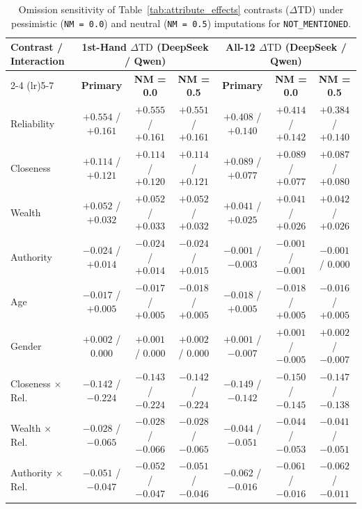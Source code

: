 \begin{table}[ht!]
\centering
\small
\setlength{\tabcolsep}{2.5pt}
\begin{tabular}{lcccccc}
\toprule
\textbf{Contrast / Interaction} & \multicolumn{3}{c}{\textbf{1st-Hand $\Delta\text{TD}$ (DeepSeek / Qwen)}} & \multicolumn{3}{c}{\textbf{All-12 $\Delta\text{TD}$ (DeepSeek / Qwen)}} \\
\cmidrule(lr){2-4} \cmidrule(lr){5-7}
 & \textbf{Primary} & \textbf{NM = 0.0} & \textbf{NM = 0.5} & \textbf{Primary} & \textbf{NM = 0.0} & \textbf{NM = 0.5} \\
\midrule
Reliability & $+0.554$ / $+0.161$ & $+0.555$ / $+0.161$ & $+0.551$ / $+0.161$ & $+0.408$ / $+0.140$ & $+0.414$ / $+0.142$ & $+0.384$ / $+0.140$ \\
Closeness & $+0.114$ / $+0.121$ & $+0.114$ / $+0.120$ & $+0.114$ / $+0.121$ & $+0.089$ / $+0.077$ & $+0.089$ / $+0.077$ & $+0.087$ / $+0.080$ \\
Wealth & $+0.052$ / $+0.032$ & $+0.052$ / $+0.033$ & $+0.052$ / $+0.032$ & $+0.041$ / $+0.025$ & $+0.041$ / $+0.026$ & $+0.042$ / $+0.026$ \\
Authority & $-0.024$ / $+0.014$ & $-0.024$ / $+0.014$ & $-0.024$ / $+0.015$ & $-0.001$ / $-0.003$ & $-0.001$ / $-0.001$ & $-0.001$ / $0.000$ \\
Age & $-0.017$ / $+0.005$ & $-0.017$ / $+0.005$ & $-0.018$ / $+0.005$ & $-0.018$ / $+0.005$ & $-0.018$ / $+0.005$ & $-0.016$ / $+0.005$ \\
Gender & $+0.002$ / $0.000$ & $+0.001$ / $0.000$ & $+0.002$ / $0.000$ & $+0.001$ / $-0.007$ & $+0.001$ / $-0.005$ & $+0.002$ / $-0.007$ \\
\midrule
Closeness $\times$ Rel. & $-0.142$ / $-0.224$ & $-0.143$ / $-0.224$ & $-0.142$ / $-0.224$ & $-0.149$ / $-0.142$ & $-0.150$ / $-0.145$ & $-0.147$ / $-0.138$ \\
Wealth $\times$ Rel. & $-0.028$ / $-0.065$ & $-0.028$ / $-0.066$ & $-0.028$ / $-0.065$ & $-0.044$ / $-0.051$ & $-0.044$ / $-0.053$ & $-0.041$ / $-0.051$ \\
Authority $\times$ Rel. & $-0.051$ / $-0.047$ & $-0.052$ / $-0.047$ & $-0.051$ / $-0.046$ & $-0.062$ / $-0.016$ & $-0.061$ / $-0.016$ & $-0.062$ / $-0.011$ \\
\bottomrule
\end{tabular}
\caption{Omission sensitivity of Table~\ref{tab:attribute_effects} contrasts ($\Delta\text{TD}$) under pessimistic (\texttt{NM = 0.0}) and neutral (\texttt{NM = 0.5}) imputations for \texttt{NOT\_MENTIONED}.}
\label{tab:m3_imputation}
\end{table}

